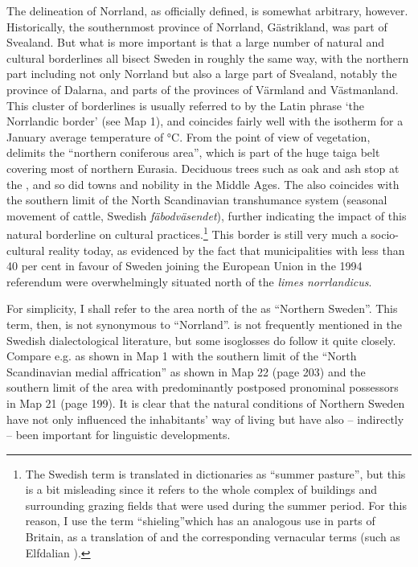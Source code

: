 The delineation of Norrland, as officially defined, is somewhat arbitrary, however. Historically, the southernmost province of Norrland, Gästrikland, was part of Svealand. But what is more important is that a large number of natural and cultural borderlines all bisect Sweden in roughly the same way, with the northern part including not only Norrland but also a large part of Svealand, notably the province of Dalarna, and parts of the provinces of Värmland and Västmanland. This cluster of borderlines is usually referred to by the Latin phrase  ‘the Norrlandic border’ (see Map 1), and coincides fairly well with the isotherm for a January average temperature of °C. From the point of view of vegetation,  delimits the “northern coniferous area”, which is part of the huge taiga belt covering most of northern Eurasia. Deciduous trees such as oak and ash stop at the , and so did towns and nobility in the Middle Ages. The  also coincides with the southern limit of the North Scandinavian transhumance system (seasonal movement of cattle, Swedish \textit{fäbodväsendet}), further indicating the impact of this natural borderline on cultural practices.\footnote{ The Swedish term is translated in dictionaries as “summer pasture”, but this is a bit misleading since it refers to the whole complex of buildings and surrounding grazing fields that were used during the summer period. For this reason, I use the term “shieling”\textstyleLinguisticExample{, }which has an analogous use in parts of Britain, as a translation of  and the corresponding vernacular terms (such as Elfdalian ).} This border is still very much a socio-cultural reality today, as evidenced by the fact that municipalities with less than 40 per cent in favour of Sweden joining the European Union in the 1994 referendum were overwhelmingly situated north of the \textit{limes norrlandicus}.


For simplicity, I shall refer to the area north of the  as “Northern Sweden”. This term, then, is not synonymous to “Norrland”.  is not frequently mentioned in the Swedish dialectological literature, but some isoglosses do follow it quite closely. Compare e.g.  as shown in Map 1 with the southern limit of the “North Scandinavian medial affrication” as shown in Map 22 (page 203) and the southern limit of the area with predominantly postposed pronominal possessors in Map 21 (page 199). It is clear that the natural conditions of Northern Sweden have not only influenced the inhabitants’ way of living but have also – indirectly – been important for linguistic developments.

